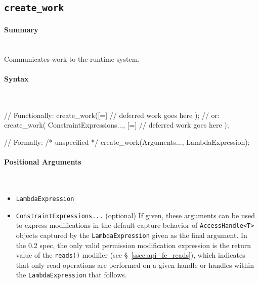 \subsection{\texttt{create\_work}}
\label{ssec:api_fe_cw}

\paragraph{Summary}\mbox{}\\
Communicates work to the runtime system.

\paragraph{Syntax}\mbox{}\\
\begin{CppCode}
// Functionally:
create_work([=]{
  // deferred work goes here
});
// or:
create_work(
  ConstraintExpressions..., 
  [=]{
	// deferred work goes here
  }
);

// Formally:
/* unspecified */ create_work(Arguments..., LambdaExpression);
\end{CppCode}

\paragraph{Positional Arguments}\mbox{}\\
\begin{itemize}
  \item \texttt{LambdaExpression} 
  \item \texttt{ConstraintExpressions...} (optional) If given, these
  arguments can be used to express modifications in the default capture behavior
  of \texttt{AccessHandle<T>} objects captured by the \texttt{LambdaExpression}
  given as the final argument.  In the 0.2 spec, the only valid permission
  modification expression is the return value of the \texttt{reads()} modifier
  (see \S~\ref{ssec:api_fe_reads}), which indicates that only read operations
  are performed on a given handle or handles within the
  \texttt{LambdaExpression} that follows.
\end{itemize}



